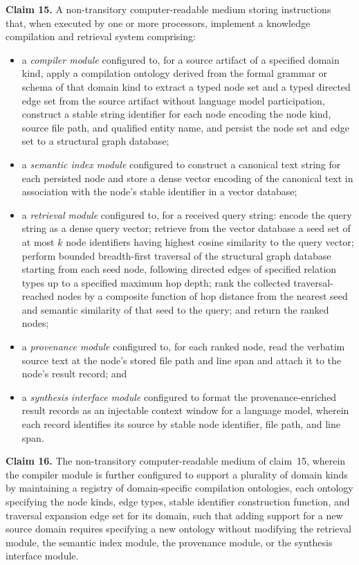\documentclass[12pt]{article}
\begin{document}
\bigskip
\noindent\textbf{Claim 15.}\quad
A non-transitory computer-readable medium storing instructions that, when
executed by one or more processors, implement a knowledge compilation and
retrieval system comprising:
\begin{itemize}[leftmargin=2.5em]
  \item a \emph{compiler module} configured to, for a source artifact of a
    specified domain kind, apply a compilation ontology derived from the formal
    grammar or schema of that domain kind to extract a typed node set and a typed
    directed edge set from the source artifact without language model
    participation, construct a stable string identifier for each node encoding
    the node kind, source file path, and qualified entity name, and persist the
    node set and edge set to a structural graph database;
  \item a \emph{semantic index module} configured to construct a canonical text
    string for each persisted node and store a dense vector encoding of the
    canonical text in association with the node's stable identifier in a vector
    database;
  \item a \emph{retrieval module} configured to, for a received query string:
    encode the query string as a dense query vector; retrieve from the vector
    database a seed set of at most $k$ node identifiers having highest cosine
    similarity to the query vector; perform bounded breadth-first traversal of
    the structural graph database starting from each seed node, following
    directed edges of specified relation types up to a specified maximum hop
    depth; rank the collected traversal-reached nodes by a composite function of
    hop distance from the nearest seed and semantic similarity of that seed to
    the query; and return the ranked nodes;
  \item a \emph{provenance module} configured to, for each ranked node, read the
    verbatim source text at the node's stored file path and line span and attach
    it to the node's result record; and
  \item a \emph{synthesis interface module} configured to format the
    provenance-enriched result records as an injectable context window for a
    language model, wherein each record identifies its source by stable node
    identifier, file path, and line span.
\end{itemize}

\bigskip
\noindent\textbf{Claim 16.}\quad
The non-transitory computer-readable medium of claim~15, wherein the compiler
module is further configured to support a plurality of domain kinds by
maintaining a registry of domain-specific compilation ontologies, each ontology
specifying the node kinds, edge types, stable identifier construction function,
and traversal expansion edge set for its domain, such that adding support for a
new source domain requires specifying a new ontology without modifying the
retrieval module, the semantic index module, the provenance module, or the
synthesis interface module.
\end{document}
